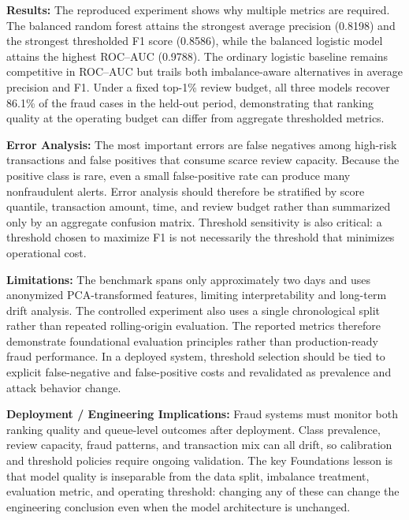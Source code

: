\textbf{Results:} The reproduced experiment shows why multiple metrics are required. The balanced random forest attains the strongest average precision (0.8198) and the strongest thresholded F1 score (0.8586), while the balanced logistic model attains the highest ROC--AUC (0.9788). The ordinary logistic baseline remains competitive in ROC--AUC but trails both imbalance-aware alternatives in average precision and F1. Under a fixed top-1\% review budget, all three models recover 86.1\% of the fraud cases in the held-out period, demonstrating that ranking quality at the operating budget can differ from aggregate thresholded metrics.

\textbf{Error Analysis:} The most important errors are false negatives among high-risk transactions and false positives that consume scarce review capacity. Because the positive class is rare, even a small false-positive rate can produce many nonfraudulent alerts. Error analysis should therefore be stratified by score quantile, transaction amount, time, and review budget rather than summarized only by an aggregate confusion matrix. Threshold sensitivity is also critical: a threshold chosen to maximize F1 is not necessarily the threshold that minimizes operational cost.

\textbf{Limitations:} The benchmark spans only approximately two days and uses anonymized PCA-transformed features, limiting interpretability and long-term drift analysis. The controlled experiment also uses a single chronological split rather than repeated rolling-origin evaluation. The reported metrics therefore demonstrate foundational evaluation principles rather than production-ready fraud performance. In a deployed system, threshold selection should be tied to explicit false-negative and false-positive costs and revalidated as prevalence and attack behavior change.

\textbf{Deployment / Engineering Implications:} Fraud systems must monitor both ranking quality and queue-level outcomes after deployment. Class prevalence, review capacity, fraud patterns, and transaction mix can all drift, so calibration and threshold policies require ongoing validation. The key Foundations lesson is that model quality is inseparable from the data split, imbalance treatment, evaluation metric, and operating threshold: changing any of these can change the engineering conclusion even when the model architecture is unchanged.

